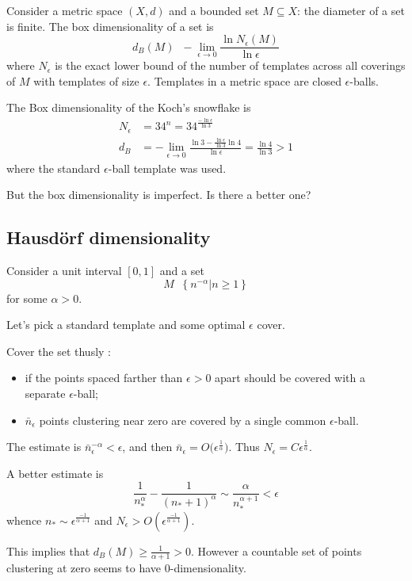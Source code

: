 \documentclass[a4paper]{article}
\newcommand{\obj}[1]{{\left\{ #1 \right \}}}
\newcommand{\clo}[1]{{\left [ #1 \right ]}}
\newcommand{\induc}[1]{{\left . #1 \right \vert}}
\newcommand{\defn}{\mathop{\overset{\Delta}{=}}\nolimits}
\begin{document}
Consider a metric space $(X,d)$ and a bounded set $M\subseteq X$: the diameter of a set is finite. The box dimensionality of a set is
\[d_B(M)\defn -\lim_{\epsilon\to 0} \frac{\ln N_\epsilon(M)}{\ln \epsilon}\]
where $N_\epsilon$ is the exact lower bound of the number of templates across all coverings of $M$ with templates of size $\epsilon$. Templates in a metric space are closed $\epsilon$-balls.

The Box dimensionality of the Koch's snowflake is
\begin{align*}
	N_\epsilon &= 3 4^n = 3 4^\frac{-\ln \epsilon}{\ln 3}\\
	d_B &= -\lim_{\epsilon\to 0} \frac{\ln 3 - \frac{\ln \epsilon}{\ln 3} \ln 4}{\ln \epsilon} = \frac{\ln 4}{\ln 3} > 1
\end{align*}
where the standard $\epsilon$-ball template was used.

But the box dimensionality is imperfect. Is there a better one?

\subsection{Hausd\"orf dimensionality} %
\label{sub:hausdorf_dimensionality}

Consider a unit interval $\clo{0,1}$ and a set 
\[M \defn \obj{ \induc{ n^{-\alpha} } n\geq 1}\]
for some $\alpha>0$.

Let's pick a standard template and some optimal $\epsilon$ cover.

Cover the set thusly : \begin{itemize}
	\item if the points spaced farther than $\epsilon>0$ apart should be covered with a separate $\epsilon$-ball;
	\item $\bar{n}_\epsilon$ points clustering near zero are covered by a single common $\epsilon$-ball.
\end{itemize}
The estimate is $\bar{n}_\epsilon ^ {-\alpha} < \epsilon$, and then $\bar{n}_\epsilon = O\big(\epsilon^\frac{1}{\alpha}\big)$. Thus $N_\epsilon = C\epsilon^\frac{1}{\alpha}$.

A better estimate is 
\[\frac{1}{n_*^\alpha} - \frac{1}{(n_*+1)^\alpha}\sim \frac{\alpha}{n_*^{\alpha+1}} < \epsilon\]
whence $n_*\sim \epsilon^\frac{-1}{\alpha+1}$ and $N_\epsilon > O(\epsilon^\frac{-1}{\alpha+1})$.

This implies that $d_B(M) \geq \frac{1}{\alpha+1}>0$.
However a countable set of points clustering at zero seems to have $0$-dimensionality.
\end{document}
